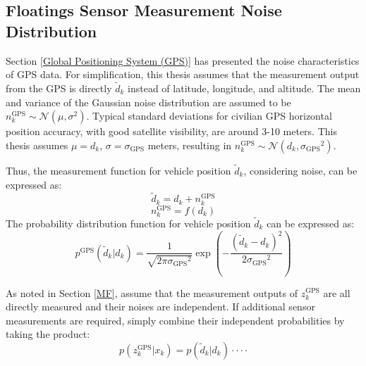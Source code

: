 \subsection{Floatings Sensor Measurement Noise Distribution}\label{Floatings sensor measurement noise distribution}
Section \ref{Global Positioning System (GPS)} has presented the noise characteristics of GPS data. For simplification, this thesis assumes that the measurement output from the GPS is directly \(\tilde d_k\) instead of latitude, longitude, and altitude. The mean and variance of the Gaussian noise distribution are assumed to be \( n_k^\text{GPS} \sim \mathcal{N}(\mu, \sigma^2) \). Typical standard deviations for civilian GPS horizontal position accuracy, with good satellite visibility, are around 3-10 meters. This thesis assumes $\mu = d_k$, \(\sigma = \sigma_\text{GPS}\) meters, resulting in \( n_k^\text{GPS} \sim \mathcal{N}(d_k, {\sigma_\text{GPS}}^2) \).

Thus, the measurement function for vehicle position \( \tilde d_k \), considering noise, can be expressed as:
\begin{equation}
    \tilde d_k = d_k + n_k^\text{GPS}
\end{equation}
\begin{equation}\label{gps noise}
    n_k^\text{GPS} = f(d_k) 
\end{equation}
The probability distribution function for vehicle position \( \tilde d_k \) can be expressed as:
\begin{equation}
    p^\text{GPS}(\tilde d_k | d_k) = \frac{1}{\sqrt{2\pi {\sigma_\text{GPS}}^2}} \exp\left(-\frac{(\tilde d_k - d_k)^2}{2{\sigma_\text{GPS}}^2}\right)
\end{equation}

As noted in Section \ref{MF}, assume that the measurement outputs of \( z_k^\text{GPS} \) are all directly measured and their noises are independent. If additional sensor measurements are required, simply combine their independent probabilities by taking the product:
\begin{equation}\label{gps probability}
    p(z_k^\text{GPS} | x_k) = p(\tilde d_k | d_k) \cdot \cdot \cdot \cdot
\end{equation}

